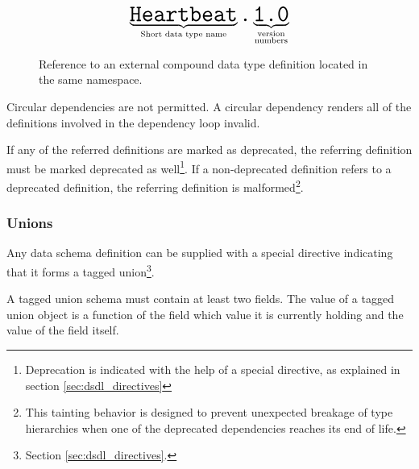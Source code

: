 \begin{figure}[H]
    $$
    \underbrace{\texttt{\huge{Heartbeat}}}_{\text{Short data type name}}%
    \texttt{\huge{.}}%
    \underbrace{\texttt{\huge{1.0}}}_{\substack{\text{version} \\ \text{numbers}}}%
    $$
    \caption{Reference to an external compound data type definition located in the same namespace.
    \label{fig:dsdl_nested_reference_short}}
\end{figure}

Circular dependencies are not permitted.
A circular dependency renders all of the definitions involved in the dependency loop invalid.

If any of the referred definitions are marked as deprecated,
the referring definition must be marked deprecated as well\footnote{%
Deprecation is indicated with the help of a special directive, as explained in section \ref{sec:dsdl_directives}}.
If a non-deprecated definition refers to a deprecated definition,
the referring definition is malformed\footnote{%
This tainting behavior is designed to prevent unexpected breakage of
type hierarchies when one of the deprecated dependencies reaches its end of life.}.

\subsubsection{Unions}

Any data schema definition can be supplied with a special directive indicating that
it forms a tagged union\footnote{Section \ref{sec:dsdl_directives}.}.

A tagged union schema must contain at least two fields.
The value of a tagged union object is a function of the field which value it is currently holding
and the value of the field itself.
